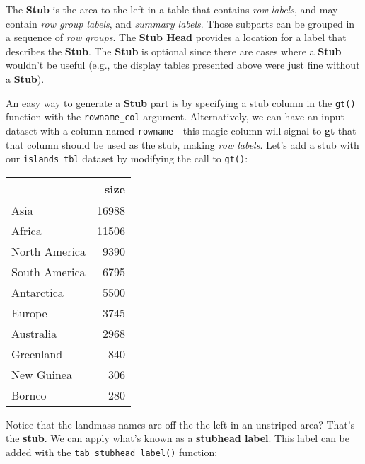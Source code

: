 \documentclass[]{article}
\newenvironment{Shaded}{\begin{snugshade}}{\end{snugshade}}
\newcommand{\KeywordTok}[1]{\textcolor[rgb]{0.13,0.29,0.53}{\textbf{#1}}}
\newcommand{\DataTypeTok}[1]{\textcolor[rgb]{0.13,0.29,0.53}{#1}}
\newcommand{\StringTok}[1]{\textcolor[rgb]{0.31,0.60,0.02}{#1}}
\newcommand{\CommentTok}[1]{\textcolor[rgb]{0.56,0.35,0.01}{\textit{#1}}}
\newcommand{\OperatorTok}[1]{\textcolor[rgb]{0.81,0.36,0.00}{\textbf{#1}}}
\newcommand{\NormalTok}[1]{#1}
\begin{document}
The \textbf{Stub} is the area to the left in a table that contains
\emph{row labels}, and may contain \emph{row group labels}, and
\emph{summary labels}. Those subparts can be grouped in a sequence of
\emph{row groups}. The \textbf{Stub Head} provides a location for a
label that describes the \textbf{Stub}. The \textbf{Stub} is optional
since there are cases where a \textbf{Stub} wouldn't be useful (e.g.,
the display tables presented above were just fine without a
\textbf{Stub}).

An easy way to generate a \textbf{Stub} part is by specifying a stub
column in the \texttt{gt()} function with the \texttt{rowname\_col}
argument. Alternatively, we can have an input dataset with a column
named \texttt{rowname}---this magic column will signal to \textbf{gt}
that that column should be used as the stub, making \emph{row labels}.
Let's add a stub with our \texttt{islands\_tbl} dataset by modifying the
call to \texttt{gt()}:

\begin{Shaded}
\end{Shaded}

\captionsetup[table]{labelformat=empty,skip=1pt}

\begin{longtable}{lr}
\toprule
 & size \\ 
\midrule
Asia & 16988 \\ 
Africa & 11506 \\ 
North America & 9390 \\ 
South America & 6795 \\ 
Antarctica & 5500 \\ 
Europe & 3745 \\ 
Australia & 2968 \\ 
Greenland & 840 \\ 
New Guinea & 306 \\ 
Borneo & 280 \\ 
\bottomrule
\end{longtable}

Notice that the landmass names are off the the left in an unstriped
area? That's the \textbf{stub}. We can apply what's known as a
\textbf{stubhead label}. This label can be added with the
\texttt{tab\_stubhead\_label()} function:
\end{document}
